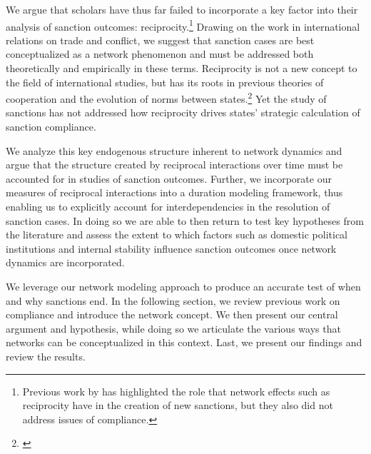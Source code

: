 We argue that scholars have thus far failed to incorporate a key factor into their analysis of sanction outcomes: reciprocity.\footnote{Previous work by \cite{cranmer2014reciprocity} has highlighted the role that network effects such as reciprocity have in the creation of new sanctions, but they also did not address issues of compliance.} Drawing on the work in international relations on trade and conflict, we suggest that sanction cases are best conceptualized as a network phenomenon and must be addressed both theoretically and empirically in these terms. Reciprocity is not a new concept to the field of international studies, but has its roots in previous theories of cooperation and the evolution of norms between states.\footnote{\cite{richardsonai:1960,choucri:north:1972,goldstein1991reciprocity,rajmaira1990evolving,ward1992reciprocity}} Yet the study of sanctions has not addressed how reciprocity drives  states' strategic calculation of sanction compliance. 

We analyze this key endogenous structure inherent to network dynamics and argue that the structure created by reciprocal interactions over time must be accounted for in studies of sanction outcomes. Further, we incorporate our measures of reciprocal interactions into a duration modeling framework, thus enabling us to explicitly account for interdependencies in the resolution of sanction cases. In doing so we are able to then return to test key hypotheses from the literature and assess the extent to which factors such as domestic political institutions and internal stability influence sanction outcomes once network dynamics are incorporated.  

We leverage our network modeling approach to produce an accurate test of when and why sanctions end. In the following section, we review previous work on compliance and introduce the network concept. We then present our central argument and hypothesis, while doing so we articulate the various ways that networks can be conceptualized in this context. Last, we present our findings and review the results.